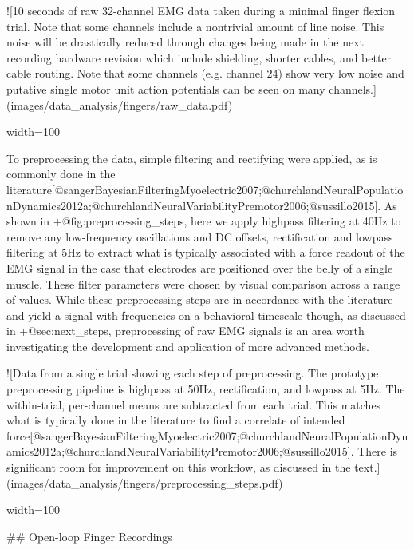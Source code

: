 \documentclass[../main.tex]{subfiles}
\begin{document}
{![10 seconds of raw 32-channel EMG data taken during a minimal finger flexion trial. Note that some channels include a nontrivial amount of line noise. This noise will be drastically reduced through changes being made in the next recording hardware revision which include shielding, shorter cables, and better cable routing. Note that some channels (e.g. channel 24) show very low noise and putative single motor unit action potentials can be seen on many channels.](images/data_analysis/fingers/raw_data.pdf){width=100%

To preprocessing the data, simple filtering and rectifying were applied, as is commonly done in the literature[@sangerBayesianFilteringMyoelectric2007;@churchlandNeuralPopulationDynamics2012a;@churchlandNeuralVariabilityPremotor2006;@sussillo2015]. As shown in {+@fig:preprocessing_steps}, here we apply highpass filtering at 40Hz to remove any low-frequency oscillations and DC offsets, rectification and lowpass filtering at 5Hz to extract what is typically associated with a force readout of the EMG signal in the case that electrodes are positioned over the belly of a single muscle. These filter parameters were chosen by visual comparison across a range of values. While these preprocessing steps are in accordance with the literature and yield a signal with frequencies on a behavioral timescale though, as discussed in {+@sec:next_steps}, preprocessing of raw EMG signals is an area worth investigating the development and application of more advanced methods.

![Data from a single trial showing each step of preprocessing. The prototype preprocessing pipeline is highpass at 50Hz, rectification, and lowpass at 5Hz. The within-trial, per-channel means are subtracted from each trial. This matches what is typically done in the literature to find a correlate of intended force[@sangerBayesianFilteringMyoelectric2007;@churchlandNeuralPopulationDynamics2012a;@churchlandNeuralVariabilityPremotor2006;@sussillo2015]. There is significant room for improvement on this workflow, as discussed in the text.](images/data_analysis/fingers/preprocessing_steps.pdf){width=100%



## Open-loop Finger Recordings

}}}
\end{document}
